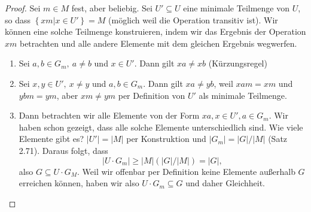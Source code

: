 \begin{proof}
	Sei $m\in M$ fest, aber beliebig. Sei $U'\subseteq U$ eine minimale Teilmenge von $U$, so dass $\left\{ xm|x\in U' \right\} =M$ (möglich weil die Operation transitiv ist). Wir können eine solche Teilmenge konstruieren, indem wir das Ergebnis der Operation $xm$ betrachten und alle andere Elemente mit dem gleichen Ergebnis wegwerfen.  
	\begin{enumerate}[label=(\roman*)]
		\item Sei $a,b\in G_m,~a\neq b$ und $x\in U'$. Dann gilt $xa\neq xb$ (Kürzungsregel)
		\item Sei $x,y\in U',~x\neq y$ und $a,b\in G_m$. Dann gilt $xa\neq yb$, weil $xam=xm$ und $ybm=ym$, aber $xm\neq ym$ per Definition von $U'$ als minimale Teilmenge.
		\item Dann betrachten wir alle Elemente von der Form $xa,x\in U', a\in G_m$. Wir haben schon gezeigt, dass alle solche Elemente unterschiedlich sind. Wie viele Elemente gibt es? $|U'|=|M|$ per Konstruktion und $|G_m|=|G| / |M|$ (Satz 2.71). Daraus folgt, dass
			\[
			|U\cdot G_m|\ge |M|(|G| / |M|)=|G|
			,\]
			also $G\subseteq U\cdot G_M$. Weil wir offenbar per Definition keine Elemente außerhalb $G$ erreichen können, haben wir also $U\cdot G_m\subseteq G$ und daher Gleichheit.\qedhere
	\end{enumerate}
\end{proof}
